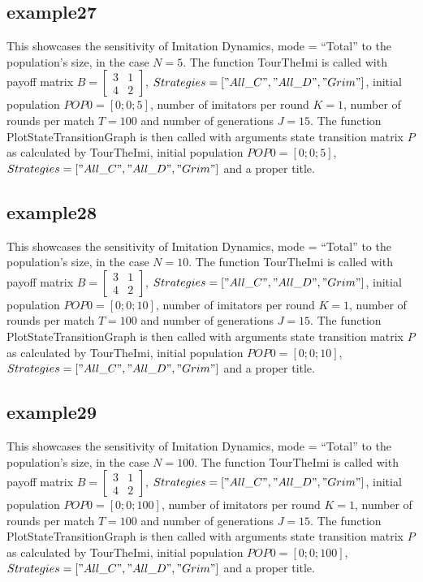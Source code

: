 \subsection{example27}
This showcases the sensitivity of Imitation Dynamics, mode = ``Total'' to the population's size, in the case $N=5$. The function TourTheImi is called with payoff matrix $B = \begin{bmatrix} 3 & 1 \\ 4 & 2 \end{bmatrix}$, $Strategies = ["All\_C", "All\_D", "Grim"]$, initial population $POP0 = [0; 0; 5]$, number of imitators per round $K=1$, number of rounds per match $T = 100$ and number of generations $J = 15$. The function PlotStateTransitionGraph is then called with arguments state transition matrix $P$ as calculated by TourTheImi, initial population $POP0 = [0; 0; 5]$, $Strategies = ["All\_C", "All\_D", "Grim"]$ and a proper title.

\subsection{example28}
This showcases the sensitivity of Imitation Dynamics, mode = ``Total'' to the population's size, in the case $N=10$. The function TourTheImi is called with payoff matrix $B = \begin{bmatrix} 3 & 1 \\ 4 & 2 \end{bmatrix}$, $Strategies = ["All\_C", "All\_D", "Grim"]$, initial population $POP0 = [0; 0; 10]$, number of imitators per round $K=1$, number of rounds per match $T = 100$ and number of generations $J = 15$. The function PlotStateTransitionGraph is then called with arguments state transition matrix $P$ as calculated by TourTheImi, initial population $POP0 = [0; 0; 10]$, $Strategies = ["All\_C", "All\_D", "Grim"]$ and a proper title.

\subsection{example29}
This showcases the sensitivity of Imitation Dynamics, mode = ``Total'' to the population's size, in the case $N=100$. The function TourTheImi is called with payoff matrix $B = \begin{bmatrix} 3 & 1 \\ 4 & 2 \end{bmatrix}$, $Strategies = ["All\_C", "All\_D", "Grim"]$, initial population $POP0 = [0; 0; 100]$, number of imitators per round $K=1$, number of rounds per match $T = 100$ and number of generations $J = 15$. The function PlotStateTransitionGraph is then called with arguments state transition matrix $P$ as calculated by TourTheImi, initial population $POP0 = [0; 0; 100]$, $Strategies = ["All\_C", "All\_D", "Grim"]$ and a proper title.

